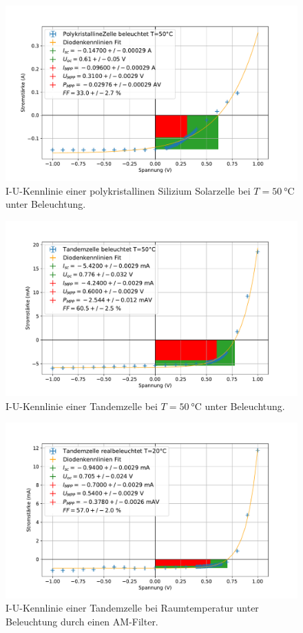 \documentclass[
	a4paper,
	12pt,
	pagesize,
	ngerman
]{scrartcl}
\begin{document}
	\begin{figure}[H]
			\includegraphics[width=.9\linewidth]{img/PolykristallineZelle_beleuchtet_50.pdf}
			\caption{
				I-U-Kennlinie einer polykristallinen Silizium Solarzelle bei $T=\SI{50}{\celsius}$ unter Beleuchtung.
								}
			\label{fig_poly_beleuchtet_50}
	\end{figure}


	\begin{figure}[H]
			\includegraphics[width=.9\linewidth]{img/Tandemzelle_beleuchtet_50.pdf}
			\caption{
				I-U-Kennlinie einer Tandemzelle bei $T=\SI{50}{\celsius}$ unter Beleuchtung.
								}
			\label{fig_tandem_beleuchtet_50}
	\end{figure}

	\begin{figure}[H]
			\includegraphics[width=.9\linewidth]{img/Tandemzelle_realbeleuchtet_20.pdf}
			\caption{
				I-U-Kennlinie einer Tandemzelle bei Raumtemperatur unter Beleuchtung durch einen AM-Filter.
			}
			\label{fig_tandem_realbeleuchtet_20}
	\end{figure}
\end{document}
